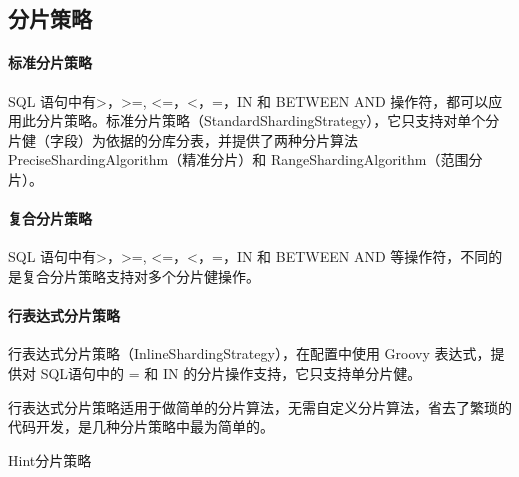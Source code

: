 \documentclass[../../../interview-questions.tex]{subfiles}
\begin{document}
\subsection{分片策略}

\paragraph{标准分片策略}

SQL 语句中有>，>=, <=，<，=，IN 和 BETWEEN AND 操作符，都可以应用此分片策略。标准分片策略（StandardShardingStrategy），它只支持对单个分片健（字段）为依据的分库分表，并提供了两种分片算法 PreciseShardingAlgorithm（精准分片）和 RangeShardingAlgorithm（范围分片）。

\paragraph{复合分片策略}

SQL 语句中有>，>=, <=，<，=，IN 和 BETWEEN AND 等操作符，不同的是复合分片策略支持对多个分片健操作。

\paragraph{行表达式分片策略}

行表达式分片策略（InlineShardingStrategy），在配置中使用 Groovy 表达式，提供对 SQL语句中的 = 和 IN 的分片操作支持，它只支持单分片健。

行表达式分片策略适用于做简单的分片算法，无需自定义分片算法，省去了繁琐的代码开发，是几种分片策略中最为简单的。


Hint分片策略
\end{document}
